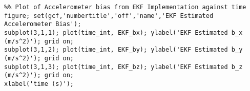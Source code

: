\begin{lstlisting}
%% Plot of Accelerometer bias from EKF Implementation against time
figure; set(gcf,'numbertitle','off','name','EKF Estimated Accelerometer Bias');  
subplot(3,1,1); plot(time_int, EKF_bx); ylabel('EKF Estimated b_x (m/s^2)'); grid on;
subplot(3,1,2); plot(time_int, EKF_by); ylabel('EKF Estimated b_y (m/s^2)'); grid on;
subplot(3,1,3); plot(time_int, EKF_bz); ylabel('EKF Estimated b_z (m/s^2)'); grid on;
xlabel('time (s)');
\end{lstlisting}
\label{fig:completecode}
